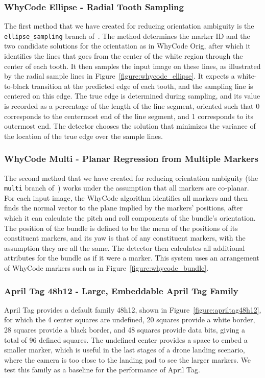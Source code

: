 \subsubsection{WhyCode Ellipse - Radial Tooth Sampling}
The first method that we have created for reducing orientation ambiguity is the \texttt{ellipse\_sampling} branch of~\cite{uzgit_whycon}.
The method determines the marker ID and the two candidate solutions for the orientation as in WhyCode Orig,
after which it identifies the lines that goes from the center of the white region through the center of each tooth.
It then samples the input image on these lines,
as illustrated by the radial sample lines in Figure~\ref{figure:whycode_ellipse}.
It expects a white-to-black transition at the predicted edge of each tooth, and the sampling line is centered on this edge.
The true edge is determined during sampling, and its value is recorded as a percentage of the length of the line segment,
oriented such that 0 corresponds to the centermost end of the line segment, and 1 corresponds to its outermost end.
The detector chooses the solution that minimizes the variance of the location of the true edge over the sample lines.

\subsubsection{WhyCode Multi - Planar Regression from Multiple Markers}
The second method that we have created for reducing orientation ambiguity (the \texttt{multi} branch of~\cite{uzgit_whycon})
works under the assumption that all markers are co-planar.
For each input image, the WhyCode algorithm identifies all markers and
then finds the normal vector to the plane implied by the markers' positions,
after which it can calculate the pitch and roll components of the bundle's orientation.
The position of the bundle is defined to be the mean of the positions of its constituent markers,
and its yaw is that of any constituent markers, with the assumption they are all the same.
The detector then calculates all additional attributes for the bundle as if it were a marker.
This system uses an arrangement of WhyCode markers such as in Figure~\ref{figure:whycode_bundle}.

\subsubsection{April Tag 48h12 - Large, Embeddable April Tag Family}
April Tag provides a default family 48h12, shown in Figure~\ref{figure:apriltag48h12},
for which the 4 center squares are undefined,
20 squares provide a white border,
28 squares provide a black border,
and 48 squares provide data bits,
giving a total of 96 defined squares.
The undefined center provides a space to embed a smaller marker,
which is useful in the last stages of a drone landing scenario,
where the camera is too close to the landing pad to see the larger markers.
We test this family as a baseline for the performance of April Tag.

